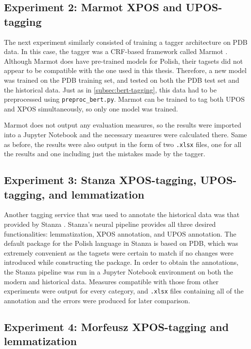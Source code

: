 \subsection{Experiment 2: Marmot XPOS and UPOS-tagging}
\label{subsec:marmot-tagging}

The next experiment similarly consisted of training a tagger architecture on PDB data. In this case, the tagger was a CRF-based framework called Marmot \citep{mueller-etal-2013-efficient}. Although Marmot does have pre-trained models for Polish, their tagsets did not appear to be compatible with the one used in this thesis. Therefore, a new model was trained on the PDB training set, and tested on both the PDB test set and the historical data. Just as in \autoref{subsec:bert-tagging}, this data had to be preprocessed using \texttt{preproc\_bert.py}. Marmot can be trained to tag both UPOS and XPOS simultaneously, so only one model was trained. 

Marmot does not output any evaluation measures, so the results were imported into a Jupyter Notebook and the necessary measures were calculated there. Same as before, the results were also output in the form of two \texttt{.xlsx} files, one for all the results and one including just the mistakes made by the tagger.

\subsection{Experiment 3: Stanza XPOS-tagging, UPOS-tagging, and lemmatization}
\label{subsec:stanza-tagging}

Another tagging service that was used to annotate the historical data was that provided by Stanza \citep{manning-etal-2014-stanford, qi2020stanza}. Stanza's neural pipeline provides all three desired functionalities: lemmatization, XPOS annotation, and UPOS annotation. The default package for the Polish language in Stanza is based on PDB, which was extremely convenient as the tagsets were certain to match if no changes were introduced while constructing the package. In order to obtain the annotations, the Stanza pipeline was run in a Jupyter Notebook environment on both the modern and historical data. Measures compatible with those from other experiments were output for every category, and \texttt{.xlsx} files containing all of the annotation and the errors were produced for later comparison.

\subsection{Experiment 4: Morfeusz XPOS-tagging and lemmatization}
\label{subsec:morfeusz-tagging}

